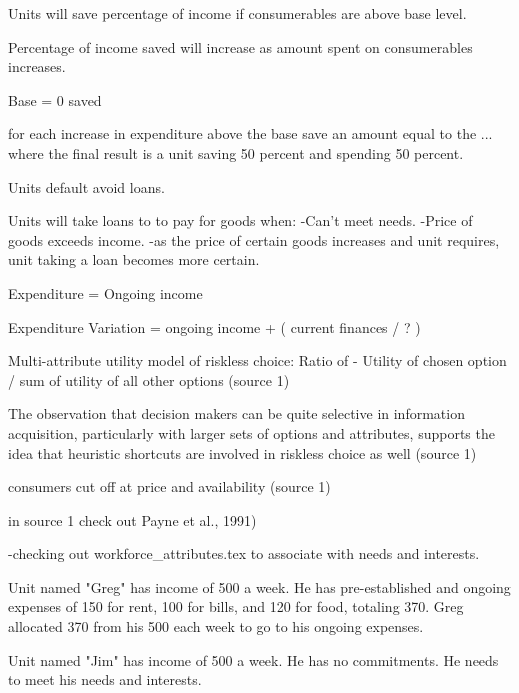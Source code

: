 Units will save percentage of income if consumerables are above base level.

Percentage of income saved will increase as amount spent on consumerables increases.


Base = 0 saved

for each increase in expenditure above the base save an amount equal to the ... where the final result is a unit saving 50 percent and spending 50 percent.



Units default avoid loans.

Units will take loans to to pay for goods when:
-Can't meet needs.
-Price of goods exceeds income.
	-as the price of certain goods increases and unit requires, unit taking a loan becomes more certain. 





 

Expenditure = Ongoing income 

Expenditure Variation = ongoing income + ( current finances / ? )

Multi-attribute utility model of riskless choice:
Ratio of - Utility of chosen option / sum of utility of all other options (source 1)

The observation that decision makers can be quite selective in information acquisition, particularly with larger sets of options and attributes, supports the idea that heuristic shortcuts are involved in riskless choice as well (source 1)

consumers cut off at price and availability (source 1)

in source 1 check out Payne et al., 1991)


-checking out workforce_attributes.tex to associate with needs and interests.







Unit named "Greg" has income of 500 a week. He has pre-established and ongoing expenses of 150 for rent, 100 for bills, and 120 for food, totaling 370. Greg allocated 370 from his 500 each week to go to his ongoing expenses. 

Unit named "Jim" has income of 500 a week. He has no commitments. He needs to meet his needs and interests. 

